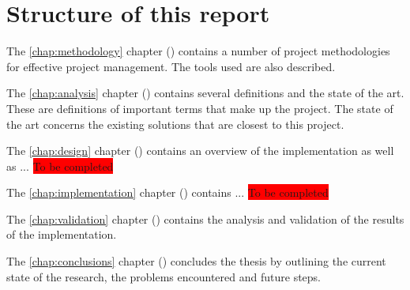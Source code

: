 \section{Structure of this report}

The \ref{chap:methodology} chapter () contains a number of project methodologies for effective project management. The tools used are also described.

The \ref{chap:analysis} chapter () contains several definitions and the state of the art. These are definitions of important terms that make up the project. The state of the art concerns the existing solutions that are closest to this project.

The \ref{chap:design} chapter () contains an overview of the implementation as well as ... \colorbox{red}{To be completed}

The \ref{chap:implementation} chapter () contains ... \colorbox{red}{To be completed}

The \ref{chap:validation} chapter () contains the analysis and validation of the results of the implementation.

The \ref{chap:conclusions} chapter () concludes the thesis by outlining the current state of the research, the problems encountered and future steps.